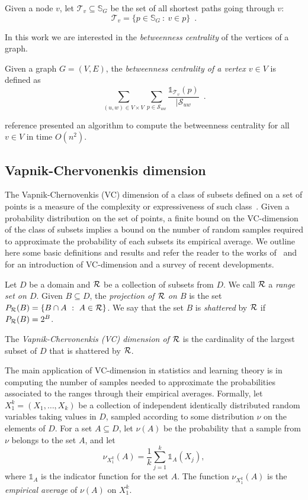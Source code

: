 Given a node $v$, let $\mathcal{T}_v\subseteq\mathbb{S}_G$ be the set of all
shortest paths going through $v$:
\[
\mathcal{T}_v=\{p\in\mathbb{S}_G ~:~ v\in p\}\enspace.
\]

In this work we are interested in the \emph{betweenness centrality} of the
vertices of a graph.
\begin{definition}\label{def:betwenness}
  Given a graph $G=(V,E)$, the \emph{betweenness centrality of a vertex $v\in
  V$} is defined as
  \[
  \sum_{(u,w)\in V\times V}\sum_{p\in\mathcal{S}_{uw}}\frac{\mathds{1}_{\mathcal{T}_v}(p)}{|\mathcal{S}_{uw}}\enspace.
  \]
\end{definition} 

\XXX reference \MR presented an algorithm to compute the betweenness centrality for
all $v\in V$ in time $O(n^2)$. 

\subsection{Vapnik-Chervonenkis dimension}\label{sec:prelvcdim}
The Vapnik-Chernovenkis (VC) dimension of a class of subsets defined
on a set of points is a measure of the complexity or expressiveness of such
class~\citep{VapnikC71}. Given a probability distribution on the set of points,
a finite bound on the VC-dimension of the class of subsets implies a bound on
the number of random samples required to approximate the probability of each
subsets its empirical average. We outline here some basic definitions and
results and refer the reader to the works of~\citet[Sect.~14.4]{AlonS08} and
\citet[Sect.~3]{BoucheronBL05} for an introduction of VC-dimension and a survey
of recent developments. 

Let $D$ be a domain and $\mathcal{R}$ be a collection of subsets from $D$. We call
$\mathcal{R}$ a \emph{range set on $D$}.
Given $B\subseteq D$, the \emph{projection of $\mathcal{R}$ on $B$} is the set 
$P_{\mathcal{R}}(B)=\{ B\cap A ~:~ A\in\mathcal{R}\}$. We say that the set $B$ is
\emph{shattered} by $\mathcal{R}$ if $P_{\mathcal{R}}(B)=2^B$.

\begin{definition}\label{def:vcdim}
  The \emph{Vapnik-Chervonenkis (VC) dimension of $\mathcal{R}$} is the cardinality
  of the largest subset of $D$ that is shattered by $\mathcal{R}$.
\end{definition}

The main application of VC-dimension in statistics and learning
theory is in computing the number of samples needed to approximate the
probabilities associated to the ranges through their empirical averages.
Formally, let $X_1^k=(X_1,\dotsc,X_k)$ be a collection of independent
identically distributed random variables taking values in $D$, sampled 
according to some distribution $\nu$ on the elements of $D$.
For a set $A\subseteq D$, let $\nu(A)$ be the probability that a sample from
$\nu$ belongs to the set $A$, and let
\[
\nu_{X_1^k}(A)=\frac{1}{k}\sum_{j=1}^k\mathds{1}_A(X_j),\]
where $\mathds{1}_A$ is the indicator function for the set $A$. The function
$\nu_{X_1^k}(A)$ is the \emph{empirical average} of $\nu(A)$ on $X_1^k$.


